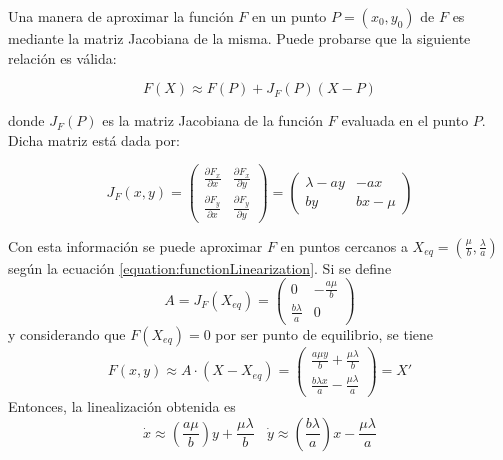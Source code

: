 \documentclass[journal, monochrome]{IEEEtran}
\begin{document}
Una manera de aproximar la función $F$ en un punto $P = (x_0,y_0)$ de $F$ es mediante la matriz Jacobiana de la misma. Puede probarse que la siguiente relación es válida:

\begin{equation}
F(X) \approx F(P) + J_{F}(P)(X-P)
\label{equation:functionLinearization}
\end{equation}

donde $J_{F}(P)$ es la matriz Jacobiana de la función $F$ evaluada en el punto $P$. Dicha matriz está dada por:

\begin{equation}
J_{F}(x, y) = \left(\begin{array}{cc}
\frac{\partial F_{x}}{\partial x} & \frac{\partial F_{x}}{\partial y} \\
\frac{\partial F_{y}}{\partial x} & \frac{\partial F_{y}}{\partial y}\end{array} \right) = \left(\begin{array}{cc}
\lambda - ay & -ax \\
by & bx-\mu \end{array} \right)
\label{equation:genericJacobian}
\end{equation}

Con esta información se puede aproximar $F$ en puntos cercanos a  $X_{eq} = (\frac{\mu}{b}, \frac{\lambda}{a})$ según la ecuación \ref{equation:functionLinearization}. Si se define
\begin{equation}
A = J_{F}(X_{eq})  = \left( \begin{array}{cc}
0 & -\frac{a\mu}{b} \\
\frac{b\lambda}{a} & 0 \end{array} \right)
\label{equation:linearMatrix}
\end{equation}
y considerando que $ F(X_{eq}) = 0 $ por ser punto de equilibrio, se tiene
\begin{equation}
F(x,y) \approx  A \cdot (X-X_{eq}) = \left( \begin{array}{c}
\frac{a \mu y}{b} + \frac{ \mu \lambda}{b}\\
\frac{b \lambda x}{a} - \frac{ \mu \lambda}{a} \end{array} \right)  = X'
\label{equation:linearization2}
\end{equation}
Entonces, la linealización obtenida es
\begin{equation}
\dot{x} \approx \left( \frac{a \mu}{b} \right) y + \frac{ \mu \lambda}{b} \ \ \ \ \dot{y} \approx \left( \frac{b \lambda}{a} \right) x - \frac{ \mu \lambda}{a}
\label{equation:clearLinearization}
\end{equation}
\end{document}
